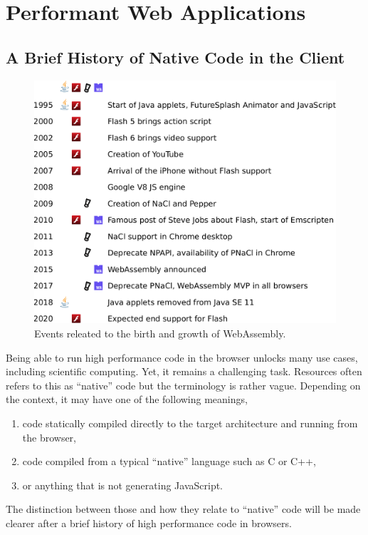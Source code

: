 \chapter{Performant Web Applications}%
\label{cha:performant_web_applications}

\minitoc%

\section{A Brief History of Native Code in the Client}%
\label{sec:native_client}

\begin{figure}[h]
	\centering
	\includegraphics[width=\linewidth]{assets/img/wasm-timeline.pdf}
	\caption{Events releated to the birth and growth of WebAssembly.}%
	\label{fig:wasm-timeline}
\end{figure}

Being able to run high performance code in the browser
unlocks many use cases, including scientific computing.
Yet, it remains a challenging task.
Resources often refers to this as ``native'' code
but the terminology is rather vague.
Depending on the context, it may have one of the following meanings,
\begin{enumerate}
\setlength\itemsep{-0.5em}
	\item code statically compiled directly to the target architecture and running from the browser,
	\item code compiled from a typical ``native'' language such as C or C++,
	\item or anything that is not generating JavaScript.
\end{enumerate}
The distinction between those and how they relate to ``native'' code
will be made clearer after a brief history of high performance code in browsers.

